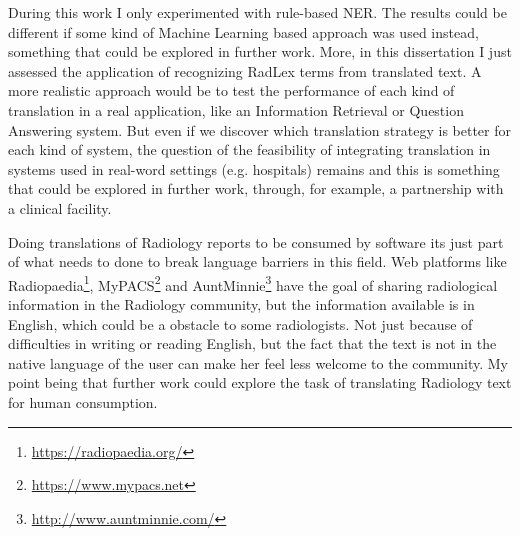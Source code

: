 During this work I only experimented with rule-based NER. The results could be different if some kind of Machine Learning based approach was used instead, something that could be explored in further work. More, in this dissertation I just assessed the application of recognizing RadLex terms from translated text. A more realistic approach would be to test the performance of each kind of translation in a real application, like an Information Retrieval \citep{Manning2009b} or Question Answering system. But even if we discover which translation strategy is better for each kind of system, the question of the feasibility of integrating translation in systems used in real-word settings (e.g. hospitals) remains and this is something that could be explored in further work, through, for example, a partnership with a clinical facility.

Doing translations of Radiology reports to be consumed by software its just part of what needs to done to break language barriers in this field. Web platforms like Radiopaedia\footnote{\url{https://radiopaedia.org/}}, MyPACS\footnote{\url{https://www.mypacs.net}} and AuntMinnie\footnote{\url{http://www.auntminnie.com/}} have the goal of sharing radiological information in the Radiology community, but the information available is in English, which could be a obstacle to some radiologists. Not just because of difficulties in writing or reading English, but the fact that the text is not in the native language of the user can make her feel less welcome to the community. My point being that further work could explore the task of translating Radiology text for human consumption.